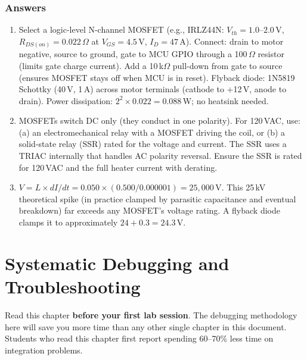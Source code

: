 \documentclass[11pt,letterpaper,twoside,openany]{book}
\begin{document}
\subsection{Answers}
\begin{enumerate}[leftmargin=1.5em]
\item Select a logic-level N-channel MOSFET (e.g., IRLZ44N: $V_{th} = 1.0$--$2.0$\,V, $R_{DS(on)} = 0.022\,\Omega$ at $V_{GS} = 4.5$\,V, $I_D = 47$\,A). Connect: drain to motor negative, source to ground, gate to MCU GPIO through a 100\,$\Omega$ resistor (limits gate charge current). Add a 10\,k$\Omega$ pull-down from gate to source (ensures MOSFET stays off when MCU is in reset). Flyback diode: 1N5819 Schottky (40\,V, 1\,A) across motor terminals (cathode to $+$12\,V, anode to drain). Power dissipation: $2^2 \times 0.022 = 0.088$\,W; no heatsink needed.
\item MOSFETs switch DC only (they conduct in one polarity). For 120\,VAC, use: (a) an electromechanical relay with a MOSFET driving the coil, or (b) a solid-state relay (SSR) rated for the voltage and current. The SSR uses a TRIAC internally that handles AC polarity reversal. Ensure the SSR is rated for 120\,VAC and the full heater current with derating.
\item $V = L \times dI/dt = 0.050 \times (0.500/0.000001) = 25{,}000$\,V. This 25\,kV theoretical spike (in practice clamped by parasitic capacitance and eventual breakdown) far exceeds any MOSFET's voltage rating. A flyback diode clamps it to approximately $24 + 0.3 = 24.3$\,V.
\end{enumerate}


\chapter{Systematic Debugging and Troubleshooting}
\label{ch:debugging}

\begin{warningbox}
Read this chapter \textbf{before your first lab session}. The debugging methodology here will save you more time than any other single chapter in this document. Students who read this chapter first report spending 60--70\% less time on integration problems.
\end{warningbox}
\end{document}
